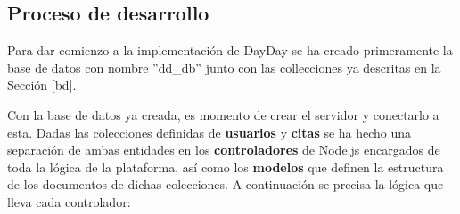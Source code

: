 \subsection{Proceso de desarrollo}
Para dar comienzo a la implementación de DayDay se ha creado primeramente la base de datos con nombre ''dd\_db'' junto con las collecciones ya descritas en la Sección \ref{bd}. \bigskip

Con la base de datos ya creada, es momento de crear el servidor y conectarlo a esta. Dadas las colecciones definidas de \textbf{usuarios} y \textbf{citas} se ha hecho una separación de ambas entidades en los \textbf{controladores} de Node.js encargados de toda la lógica de la plataforma, así como los \textbf{modelos} que definen la estructura de los documentos de dichas colecciones. A continuación se precisa la lógica que lleva cada controlador:

